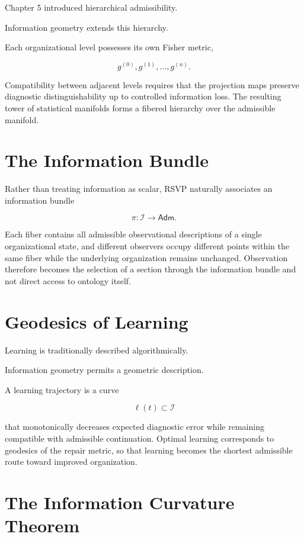 \documentclass[11pt,oneside]{book}
\numberwithin{equation}{chapter}
\theoremstyle{definition}
\theoremstyle{plain}
\newcommand{\Adm}{\mathsf{Adm}}
\begin{document}
Chapter 5 introduced hierarchical admissibility.

Information geometry extends this hierarchy.

Each organizational level possesses its own Fisher metric,

\[
g^{(0)},
g^{(1)},
\ldots,
g^{(n)}.
\]

Compatibility between adjacent levels requires that the projection maps preserve diagnostic distinguishability up to controlled information loss. The resulting tower of statistical manifolds forms a fibered hierarchy over the admissible manifold.

\section{The Information Bundle}

Rather than treating information as scalar, RSVP naturally associates an
information bundle

\[
\pi:
\mathcal I
\rightarrow
\Adm.
\]

Each fiber contains all admissible observational descriptions of a single organizational state, and different observers occupy different points within the same fiber while the underlying organization remains unchanged. Observation therefore becomes the selection of a section through the information bundle and not direct access to ontology itself.

\section{Geodesics of Learning}

Learning is traditionally described algorithmically.

Information geometry permits a geometric description.

A learning trajectory is a curve

\[
\ell(t)
\subset
\mathcal I
\]

that monotonically decreases expected diagnostic error while remaining compatible with admissible continuation. Optimal learning corresponds to geodesics of the repair metric, so that learning becomes the shortest admissible route toward improved organization.

\section{The Information Curvature Theorem}
\end{document}
